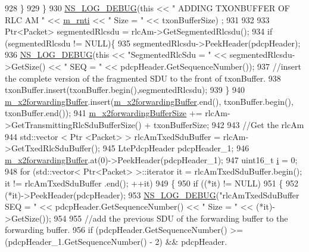 \begin{DoxyCode}
928           \}
929         \} 
930         \hyperlink{group__logging_ga413f1886406d49f59a6a0a89b77b4d0a}{NS\_LOG\_DEBUG}(\textcolor{keyword}{this} << \textcolor{stringliteral}{" ADDING TXONBUFFER OF RLC AM "} << 
      \hyperlink{classns3_1_1UeManager_a5a72b4fe818f21993bd7f05d7e2c4f83}{m\_rnti} << \textcolor{stringliteral}{" Size = "} << txonBufferSize) ;
931 
932       
933         Ptr<Packet> segmentedRlcsdu = rlcAm->GetSegmentedRlcsdu();
934         \textcolor{keywordflow}{if} (segmentedRlcsdu != NULL)\{
935           segmentedRlcsdu->PeekHeader(pdcpHeader);
936           \hyperlink{group__logging_ga413f1886406d49f59a6a0a89b77b4d0a}{NS\_LOG\_DEBUG}(\textcolor{keyword}{this} << \textcolor{stringliteral}{"SegmentedRlcSdu = "} << segmentedRlcsdu->GetSize() << \textcolor{stringliteral}{" SEQ = "} 
      << pdcpHeader.GetSequenceNumber());
937           \textcolor{comment}{//insert the complete version of the fragmented SDU to the front of txonBuffer.}
938           txonBuffer.insert(txonBuffer.begin(),segmentedRlcsdu);
939         \}
940         \hyperlink{classns3_1_1UeManager_a3fb8a9dc6ef434306f90f42837f3ae83}{m\_x2forwardingBuffer}.insert(\hyperlink{classns3_1_1UeManager_a3fb8a9dc6ef434306f90f42837f3ae83}{m\_x2forwardingBuffer}.end(), 
      txonBuffer.begin(), txonBuffer.end());
941         \hyperlink{classns3_1_1UeManager_af9b888fa844a79c14b46c50ebae65031}{m\_x2forwardingBufferSize} += rlcAm->GetTransmittingRlcSduBufferSize() + 
      txonBufferSize;
942 
943         \textcolor{comment}{//Get the rlcAm}
944         std::vector < Ptr <Packet> > rlcAmTxedSduBuffer = rlcAm->GetTxedRlcSduBuffer();
945         LtePdcpHeader pdcpHeader\_1;
946         \hyperlink{classns3_1_1UeManager_a3fb8a9dc6ef434306f90f42837f3ae83}{m\_x2forwardingBuffer}.at(0)->PeekHeader(pdcpHeader\_1);
947         uint16\_t \hyperlink{bernuolliDistribution_8m_a6f6ccfcf58b31cb6412107d9d5281426}{i} = 0;
948         \textcolor{keywordflow}{for} (std::vector< Ptr<Packet> >::iterator it = rlcAmTxedSduBuffer.begin(); it != rlcAmTxedSduBuffer
      .end(); ++it)
949         \{
950           \textcolor{keywordflow}{if} ((*it) != NULL)
951           \{
952             (*it)->PeekHeader(pdcpHeader);
953             \hyperlink{group__logging_ga413f1886406d49f59a6a0a89b77b4d0a}{NS\_LOG\_DEBUG}(\textcolor{stringliteral}{"rlcAmTxedSduBuffer SEQ = "} << pdcpHeader.GetSequenceNumber() << \textcolor{stringliteral}{"
       Size = "} << (*it)->GetSize());
954           
955             \textcolor{comment}{//add the previous SDU of the forwarding buffer to the forwarding buffer.}
956             \textcolor{keywordflow}{if} (pdcpHeader.GetSequenceNumber() >= (pdcpHeader\_1.GetSequenceNumber() - 2) && pdcpHeader.

\end{DoxyCode}
